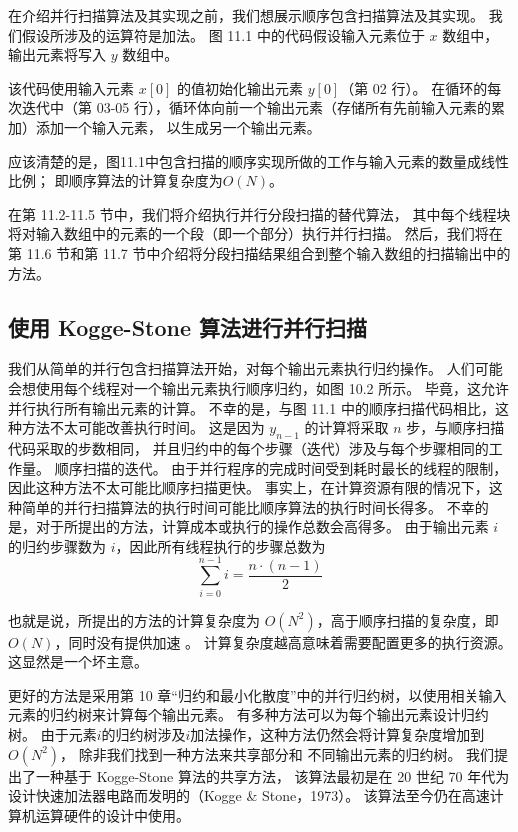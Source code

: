 在介绍并行扫描算法及其实现之前，我们想展示顺序包含扫描算法及其实现。 我们假设所涉及的运算符是加法。 
图 11.1 中的代码假设输入元素位于 $x$ 数组中，输出元素将写入 $y$ 数组中。

该代码使用输入元素 $x[0]$ 的值初始化输出元素 $y[0]$（第 02 行）。 
在循环的每次迭代中（第 03-05 行），循环体向前一个输出元素（存储所有先前输入元素的累加）添加一个输入元素，
以生成另一个输出元素。

应该清楚的是，图11.1中包含扫描的顺序实现所做的工作与输入元素的数量成线性比例； 即顺序算法的计算复杂度为$O(N)$。

在第 11.2-11.5 节中，我们将介绍执行并行分段扫描的替代算法，
其中每个线程块将对输入数组中的元素的一个段（即一个部分）执行并行扫描。 
然后，我们将在第 11.6 节和第 11.7 节中介绍将分段扫描结果组合到整个输入数组的扫描输出中的方法。

\subsection{使用 Kogge-Stone 算法进行并行扫描}
我们从简单的并行包含扫描算法开始，对每个输出元素执行归约操作。 
人们可能会想使用每个线程对一个输出元素执行顺序归约，如图 10.2 所示。 毕竟，这允许并行执行所有输出元素的计算。 
不幸的是，与图 11.1 中的顺序扫描代码相比，这种方法不太可能改善执行时间。 
这是因为 $y_{n-1}$ 的计算将采取 $n$ 步，与顺序扫描代码采取的步数相同，
并且归约中的每个步骤（迭代）涉及与每个步骤相同的工作量。 顺序扫描的迭代。 
由于并行程序的完成时间受到耗时最长的线程的限制，因此这种方法不太可能比顺序扫描更快。 
事实上，在计算资源有限的情况下，这种简单的并行扫描算法的执行时间可能比顺序算法的执行时间长得多。 
不幸的是，对于所提出的方法，计算成本或执行的操作总数会高得多。 
由于输出元素 $i$ 的归约步骤数为 $i$，因此所有线程执行的步骤总数为
$$
\sum_{i=0}^{n-1} i=\frac{n \cdot(n-1)}{2}
$$

也就是说，所提出的方法的计算复杂度为 $O\left(N^{2}\right)$，高于顺序扫描的复杂度，即 $O(N)$，同时没有提供加速 。 
计算复杂度越高意味着需要配置更多的执行资源。 这显然是一个坏主意。

更好的方法是采用第 10 章“归约和最小化散度”中的并行归约树，以使用相关输入元素的归约树来计算每个输出元素。 
有多种方法可以为每个输出元素设计归约树。 
由于元素$i$的归约树涉及$i$加法操作，这种方法仍然会将计算复杂度增加到$O\left(N^{2}\right)$，
除非我们找到一种方法来共享部分和 不同输出元素的归约树。 
我们提出了一种基于 Kogge-Stone 算法的共享方法，
该算法最初是在 20 世纪 70 年代为设计快速加法器电路而发明的（Kogge \& Stone，1973）。 
该算法至今仍在高速计算机运算硬件的设计中使用。 

